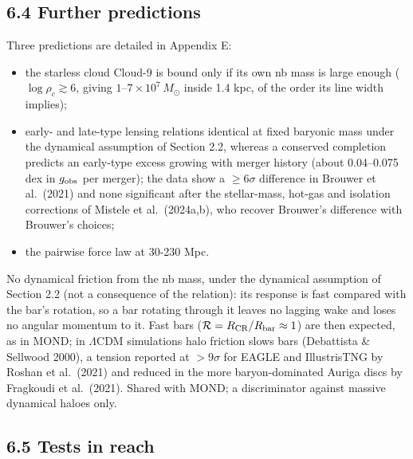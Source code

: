 \documentclass[
  10pt,
]{article}
\begin{document}
\subsection{6.4 Further predictions}

Three predictions are detailed in Appendix E:
\begin{itemize}
\item the starless cloud Cloud-9 is bound only if its own nb mass is large enough ($\log\rho_c\gtrsim6$, giving $1$--$7\times10^7\,M_\odot$ inside 1.4 kpc, of the order its line width implies);
\item early- and late-type lensing relations identical at fixed baryonic mass under the dynamical assumption of Section 2.2, whereas a conserved completion predicts an early-type excess growing with merger history (about 0.04--0.075 dex in $g_{\rm obs}$ per merger); the data show a $\ge6\sigma$ difference in Brouwer et al.~(2021) and none significant after the stellar-mass, hot-gas and isolation corrections of Mistele et al.~(2024a,b), who recover Brouwer's difference with Brouwer's choices;
\item the pairwise force law at 30-230 Mpc.
\end{itemize}
No dynamical friction from the nb mass, under the dynamical assumption of Section 2.2 (not a consequence of the relation): its response is fast compared with the bar's rotation, so a bar rotating through it leaves no lagging wake and loses no angular momentum to it. Fast bars ($\mathcal{R}=R_{\rm CR}/R_{\rm bar}\approx1$) are then expected, as in MOND; in $\Lambda$CDM simulations halo friction slows bars (Debattista \& Sellwood 2000), a tension reported at $>9\sigma$ for EAGLE and IllustrisTNG by Roshan et al.~(2021) and reduced in the more baryon-dominated Auriga discs by Fragkoudi et al.~(2021). Shared with MOND; a discriminator against massive dynamical haloes only.

\subsection{6.5 Tests in reach}
\end{document}
